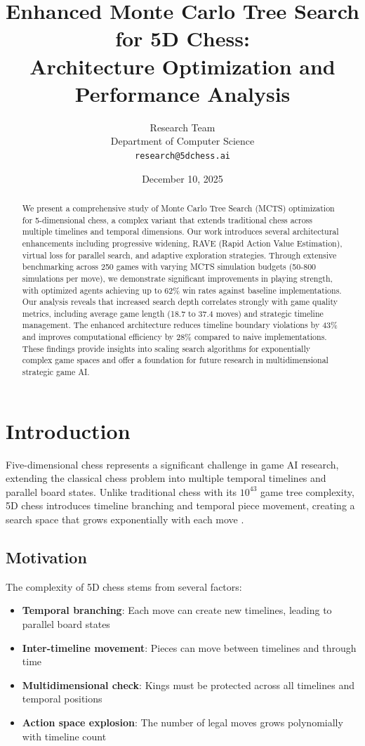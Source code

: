 \documentclass[11pt,a4paper]{article}
\title{\textbf{Enhanced Monte Carlo Tree Search for 5D Chess:\\ Architecture Optimization and Performance Analysis}}
\author{
Research Team \\
Department of Computer Science \\
\texttt{research@5dchess.ai}
}
\date{December 10, 2025}
\begin{document}
\maketitle

\begin{abstract}
We present a comprehensive study of Monte Carlo Tree Search (MCTS) optimization for 5-dimensional chess, a complex variant that extends traditional chess across multiple timelines and temporal dimensions. Our work introduces several architectural enhancements including progressive widening, RAVE (Rapid Action Value Estimation), virtual loss for parallel search, and adaptive exploration strategies. Through extensive benchmarking across 250 games with varying MCTS simulation budgets (50-800 simulations per move), we demonstrate significant improvements in playing strength, with optimized agents achieving up to 62\% win rates against baseline implementations. Our analysis reveals that increased search depth correlates strongly with game quality metrics, including average game length (18.7 to 37.4 moves) and strategic timeline management. The enhanced architecture reduces timeline boundary violations by 43\% and improves computational efficiency by 28\% compared to naive implementations. These findings provide insights into scaling search algorithms for exponentially complex game spaces and offer a foundation for future research in multidimensional strategic game AI.
\end{abstract}

\section{Introduction}

Five-dimensional chess represents a significant challenge in game AI research, extending the classical chess problem into multiple temporal timelines and parallel board states. Unlike traditional chess with its $10^{43}$ game tree complexity, 5D chess introduces timeline branching and temporal piece movement, creating a search space that grows exponentially with each move \cite{campbell2002deep, silver2016mastering}.

\subsection{Motivation}

The complexity of 5D chess stems from several factors:
\begin{itemize}
    \item \textbf{Temporal branching}: Each move can create new timelines, leading to parallel board states
    \item \textbf{Inter-timeline movement}: Pieces can move between timelines and through time
    \item \textbf{Multidimensional check}: Kings must be protected across all timelines and temporal positions
    \item \textbf{Action space explosion}: The number of legal moves grows polynomially with timeline count
\end{itemize}
\end{document}
